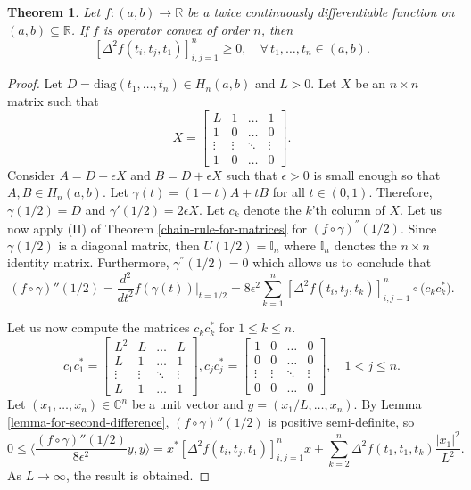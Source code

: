 \documentclass[12pt,a4paper]{amsart}
\newtheorem{theorem}{Theorem}
\theoremstyle{definition}
\newcommand{\myabs}[1]{ | #1 | }
\begin{document}
	\begin{theorem}\label{matrix-convex-implies-second-divided-difference-positive}
		Let $f: (a, b) \rightarrow \mathbb{R}$ be a twice continuously differentiable function on $(a, b) \subseteq \mathbb{R}$. If $f$ is operator convex of order $n$, then
		\[  [\Delta^{2}f(t_i, t_j, t_1)]_{i, j = 1}^{n} \geq 0, \quad \forall \,  t_1, \ldots, t_n \in (a, b).\]
	\end{theorem}
	\begin{proof}
		Let $D = \text{diag}(t_1, \ldots, t_n) \in H_n (a, b)$ and $L > 0$. Let $X$ be an $n \times n$  matrix such that
		\[ X = 
		\begin{bmatrix}
			L & 1 & \ldots & 1 \\
			1 & 0 & \ldots & 0 \\
			\vdots & \vdots & \ddots & \vdots \\
			1 & 0 & \ldots & 0
		\end{bmatrix}.
		\]
		Consider $A = D - \epsilon X$ and $B = D + \epsilon X$ such that $\epsilon > 0$ is small enough so that $A, B \in H_n(a, b)$. Let $\gamma(t) = (1-t)A + tB$ for all $t \in (0,1)$. Therefore, $\gamma(1/2) = D $ and $\gamma'(1/2) = 2 \epsilon X$. Let $c_k$ denote the $k$'th column of $X$. Let us now apply (II) of Theorem \ref{chain-rule-for-matrices} for $(f \circ \gamma)^{''}(1/2)$. Since  $\gamma(1/2)$ is a diagonal matrix, then $U(1/2) = \mathbb{I}_n$ where $\mathbb{I}_n$ denotes the $n \times n$ identity matrix. Furthermore,  $\gamma^{''}(1/2)=0$ which allows us to conclude that 
		\begin{equation*}
			(f \circ \gamma)''(1/2) = \frac{d^{2}}{d t^{2}}f(\gamma(t))\vert_{t=1/2} = 8 \epsilon^{2} \sum_{k=1}^{n} [\Delta^{2} f(t_i, t_j, t_k)]_{i,j = 1}^{n} \circ  \big( c_k c_k^{*} \big).
		\end{equation*}
		
		Let us now compute the matrices $c_k c_k^{*}$ for $1 \leq k \leq n$.
		\[  c_1 c_1^{*} =  		\begin{bmatrix}
			L^{2} & L & \ldots & L \\
			L & 1 & \ldots & 1 \\
			\vdots & \vdots & \ddots & \vdots \\
			L & 1 & \ldots & 1
		\end{bmatrix},   c_j c_j^{*} =  		\begin{bmatrix}
			1 & 0 & \ldots & 0 \\
			0 & 0 & \ldots & 0 \\
			\vdots & \vdots & \ddots & \vdots \\
			0 & 0 & \ldots & 0
		\end{bmatrix}, \quad 1 < j \leq n. \]
		Let $(x_1, \ldots, x_n) \in \mathbb{C}^{n}$ be a unit vector and $y = (x_1/L, \ldots, x_n)$. By Lemma \ref{lemma-for-second-difference}, $(f \circ \gamma)''(1/2)$ is positive semi-definite, so
		\[ 0 \leq \bigg\langle \frac{(f \circ \gamma)''(1/2)}{8 \epsilon^{2}} y,y \bigg\rangle = x^{*} [\Delta^{2} f(t_i, t_j, t_1)]_{i,j = 1}^{n} x + \sum_{k=2}^{n} \Delta^{2} f(t_1, t_1, t_k) \frac{\myabs{x_1}^{2}}{L^{2}}. \] 
		As $L \rightarrow \infty$, the result is obtained.
	\end{proof}
	
\end{document}
